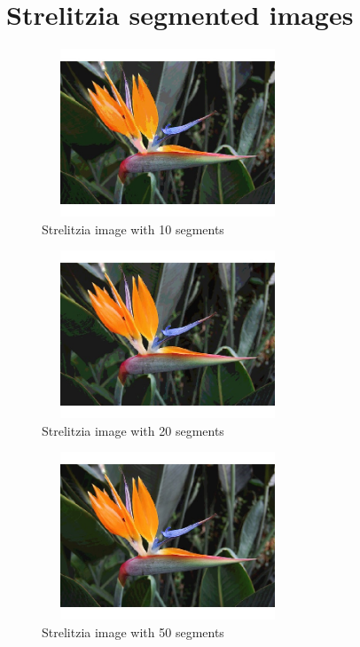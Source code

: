 \documentclass[a4paper, 11pt]{article}
\begin{document}
\section{Strelitzia segmented images}
\begin{figure}[h!]
\centering
    \includegraphics[width=7.5cm, height=5cm]{images/S_10.jpeg}
    \caption{Strelitzia image with 10 segments}
\end{figure}
\begin{figure}[h!]
\centering
    \includegraphics[width=7.5cm, height=5cm]{images/S_20.jpeg}
    \caption{Strelitzia image with 20 segments}
\end{figure}
\begin{figure}[h!]
\centering
    \includegraphics[width=7.5cm, height=5cm]{images/S_50.jpeg}
    \caption{Strelitzia image with 50 segments}
\end{figure}
\clearpage
\end{document}
